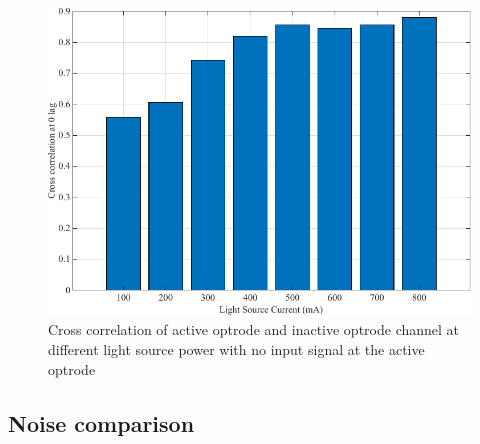 \begin{figure}[htbp]
\centerline{\includegraphics[scale=1]{5-Experiment/Cross correlation.pdf}}
\caption{Cross correlation of active optrode and inactive optrode channel at different light source power with no input signal at the active optrode}
\label{fig_Cross correlation}
\end{figure}

\subsection{Noise comparison}


